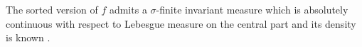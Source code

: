 The sorted version of $f$ admits a $\sigma$-finite invariant measure which is
absolutely continuous with respect to Lebesgue measure on the central part and
its density is known \cite{schweiger}.
